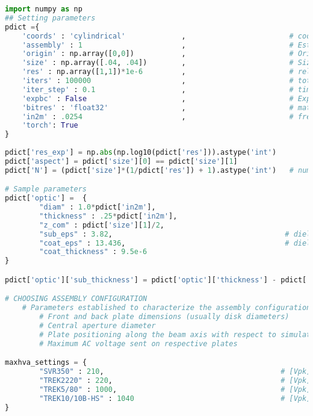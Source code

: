 \begin{lstlisting}[frame=single, language=Python]
import numpy as np
## Setting parameters
pdict ={
    'coords' : 'cylindrical'             ,                        # coordinate system chosen for simulation box
    'assembly' : 1                       ,                        # Establish plate geometry / location and voltage based on assembly 
    'origin' : np.array([0,0])           ,                        # Origin of the simulation space / map
    'size' : np.array([.04, .04])        ,                        # Size of simulation box [m] 
    'res' : np.array([1,1])*1e-6         ,                        # relative resolution [coord1, coord2]
    'iters' : 100000                     ,                        # total number of time iterations
    'iter_step' : 0.1                    ,                        # time step
    'expbc' : False                      ,                        # Exponential boundary conditions?
    'bitres' : 'float32'                 ,                        # matrix element data type ('float32' vs 'float64')
    'in2m' : .0254                       ,                        # frequently used conversion
    'torch': True
}
    
pdict['res_exp'] = np.abs(np.log10(pdict['res'])).astype('int')
pdict['aspect'] = pdict['size'][0] == pdict['size'][1]
pdict['N'] = (pdict['size']*(1/pdict['res']) + 1).astype('int')   # number of points sampled 1 dimension of simulation box

# Sample parameters
pdict['optic'] =  {
        "diam" : 1.0*pdict['in2m'],
        "thickness" : .25*pdict['in2m'], 
        "z_com" : pdict['size'][1]/2,
        "sub_eps" : 3.82,                                        # dielectric constant for substrate (fused silica)
        "coat_eps" : 13.436,                                     # dielectric constant for coating material (AlGaAs / GaAs)
        "coat_thickness" : 9.5e-6     
}

pdict['optic']['sub_thickness'] = pdict['optic']['thickness'] - pdict['optic']['coat_thickness']

# CHOOSING ASSEMBLY CONFIGURATION
    # Parameters established to characterize the assembly configurations:
        # Front and back plate dimensions (usually disk diameters)
        # Central aperture diameter
        # Plate positioning along the beam axis with respect to simulation size center
        # Maximum AC voltage sent on respective plates

maxhva_settings = {
        "SVR350" : 210,                                         # [Vpk]
        "TREK2220" : 220,                                       # [Vpk]
        "TREK5/80" : 1000,                                      # [Vpk]
        "TREK10/10B-HS" : 1040                                  # [Vpk]
} 


\end{lstlisting}
